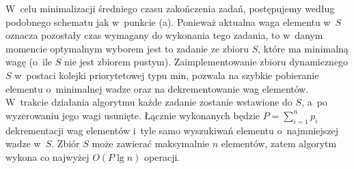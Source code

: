 W~celu minimalizacji średniego czasu zakończenia zadań, postępujemy według podobnego schematu jak w~punkcie (a).
Ponieważ aktualna waga elementu w~$S$ oznacza pozostały czas wymagany do wykonania tego zadania, to w~danym momencie optymalnym wyborem jest to zadanie ze zbioru $S$, które ma minimalną wagę (o~ile $S$ nie jest zbiorem pustym).
Zaimplementowanie zbioru dynamicznego $S$ w~postaci kolejki priorytetowej typu min, pozwala na szybkie pobieranie elementu o~minimalnej wadze oraz na dekrementowanie wag elementów.
W~trakcie działania algorytmu każde zadanie zostanie wstawione do $S$, a~po wyzerowaniu jego wagi usunięte.
Łącznie wykonanych będzie $P=\sum_{i=1}^np_i$ dekrementacji wag elementów i~tyle samo wyszukiwań elementu o~najmniejszej wadze w~$S$.
Zbiór $S$ może zawierać maksymalnie $n$ elementów, zatem algorytm wykona co najwyżej $O(P\lg n)$ operacji.
